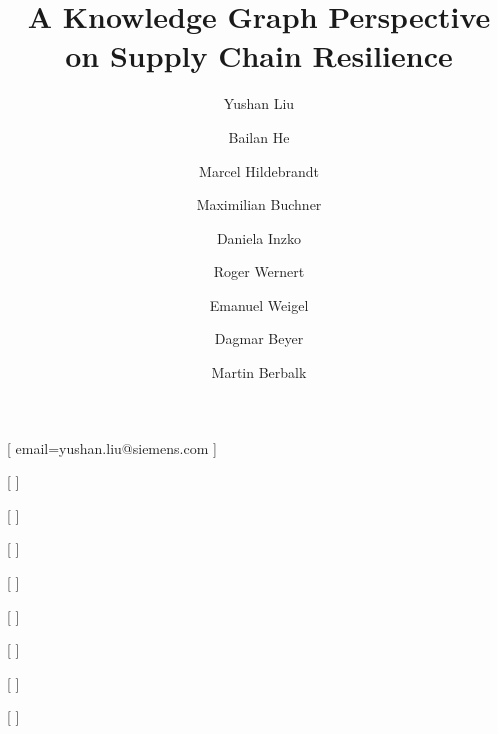 \documentclass[
]{ceurart}
\begin{document}
\title{A Knowledge Graph Perspective on Supply Chain Resilience}
\author[1,4]{Yushan Liu}[%
email=yushan.liu@siemens.com
]
\cormark[1]
\address[1]{Siemens AG, Otto-Hahn-Ring 6, 81739 Munich, Germany}
\address[2]{Siemens AG, Östliche Rheinbrückenstraße 50, 76187 Karlsruhe, Germany}
\address[3]{Siemens Schweiz AG, Theilerstraße 1a, 6300 Zug, Switzerland}
\address[4]{Ludwig-Maximilians-Universität München, Geschwister-Scholl-Platz 1, 80539 Munich, Germany}

\author[1,4]{Bailan He}[%
]

\author[1]{Marcel Hildebrandt}[%
]

\author[1]{Maximilian Buchner}[%
]

\author[1]{Daniela Inzko}[%
]

\author[3]{Roger Wernert}[%
]

\author[2]{Emanuel Weigel}[%
]

\author[1]{Dagmar Beyer}[%
]

\author[1]{Martin Berbalk}[%
]
\end{document}

